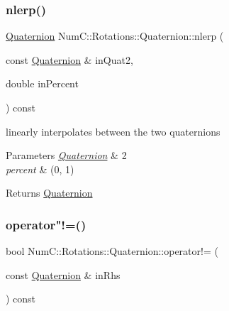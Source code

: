 \subsubsection{\texorpdfstring{nlerp()}{nlerp()}\hspace{0.1cm}{\footnotesize\ttfamily [2/2]}}
{\footnotesize\ttfamily \mbox{\hyperlink{class_num_c_1_1_rotations_1_1_quaternion}{Quaternion}} Num\+C\+::\+Rotations\+::\+Quaternion\+::nlerp (\begin{DoxyParamCaption}\item[{const \mbox{\hyperlink{class_num_c_1_1_rotations_1_1_quaternion}{Quaternion}} \&}]{in\+Quat2,  }\item[{double}]{in\+Percent }\end{DoxyParamCaption}) const\hspace{0.3cm}{\ttfamily [inline]}}

linearly interpolates between the two quaternions


\begin{DoxyParams}{Parameters}
{\em \mbox{\hyperlink{class_num_c_1_1_rotations_1_1_quaternion}{Quaternion}}} & 2 \\
\hline
{\em percent} & (0, 1) \\
\hline
\end{DoxyParams}
\begin{DoxyReturn}{Returns}
\mbox{\hyperlink{class_num_c_1_1_rotations_1_1_quaternion}{Quaternion}} 
\end{DoxyReturn}
\mbox{\label{class_num_c_1_1_rotations_1_1_quaternion_aa9ef7979f86891a96ebb4fac9e44544c}} 
\subsubsection{\texorpdfstring{operator"!=()}{operator!=()}}
{\footnotesize\ttfamily bool Num\+C\+::\+Rotations\+::\+Quaternion\+::operator!= (\begin{DoxyParamCaption}\item[{const \mbox{\hyperlink{class_num_c_1_1_rotations_1_1_quaternion}{Quaternion}} \&}]{in\+Rhs }\end{DoxyParamCaption}) const\hspace{0.3cm}{\ttfamily [inline]}}

